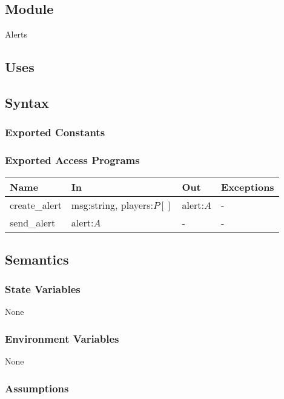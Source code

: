 \documentclass[12pt, titlepage]{article}
\begin{document}
\subsection{Module}

Alerts

\subsection{Uses}

\subsection{Syntax}

\subsubsection{Exported Constants}

\subsubsection{Exported Access Programs}

\begin{center}
\begin{tabular}{p{3cm} p{5cm} p{2cm} p{2cm}}
\hline
\textbf{Name} & \textbf{In} & \textbf{Out} & \textbf{Exceptions} \\
\hline
create\_alert & msg:string, players:$P[]$ & alert:$A$ & - \\
send\_alert & alert:$A$ & - & - \\
\hline
\end{tabular}
\end{center}

\subsection{Semantics}

\subsubsection{State Variables}

None

\subsubsection{Environment Variables}

None

\subsubsection{Assumptions}
\end{document}
